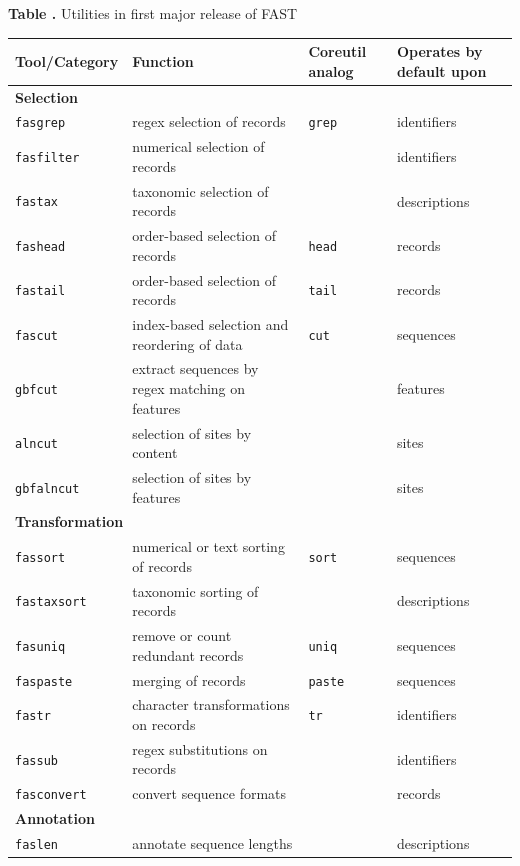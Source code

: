 \documentclass{frontiersSCNS} %
\begin{document}
\begin{table}[!t]
\textbf{\label{tab:01} Table .}{
  Utilities in first major release of FAST}

\processtable{ }
{\begin{tabular}{llll}\toprule
    Tool/Category  & Function  & Coreutil analog & Operates by default
    upon \\
 \hline
  \multicolumn{4}{l}{{\bf Selection}} \\
  \hline
    {\tt fasgrep} & regex selection of records & {\tt grep} & identifiers\\
    {\tt fasfilter} & numerical selection of records &  & identifiers \\
    {\tt fastax} & taxonomic selection of records &  & descriptions \\
    {\tt fashead} & order-based selection of records & {\tt head} & records \\
    {\tt fastail} & order-based selection of records &  {\tt tail}  & records \\
    {\tt fascut} & index-based selection and reordering of data  &    {\tt cut}  & sequences \\
    {\tt gbfcut} & extract sequences by regex matching on features  & & features\\
    {\tt alncut} & selection of sites by content &  & sites \\
    {\tt gbfalncut} & selection of sites by features &  & sites \\
 \hline
  \multicolumn{4}{l}{{\bf Transformation}} \\
  \hline    
   {\tt fassort} & numerical or text sorting of records  & {\tt sort} & sequences\\
    {\tt fastaxsort} & taxonomic sorting of records &  & descriptions
    \\
    {\tt fasuniq} & remove or count redundant records & {\tt uniq} & sequences \\
    {\tt faspaste} & merging of records &  {\tt paste} & sequences \\
    {\tt fastr} & character transformations on records & {\tt tr} & identifiers\\
    {\tt fassub} & regex substitutions on records &  & identifiers \\
    {\tt fasconvert} & convert sequence formats &  &  records \\
\hline
  \multicolumn{4}{l}{{\bf Annotation}} \\
  \hline    
    {\tt faslen} & annotate sequence lengths &  & descriptions \\

\end{tabular}}
\end{table}
\end{document}
